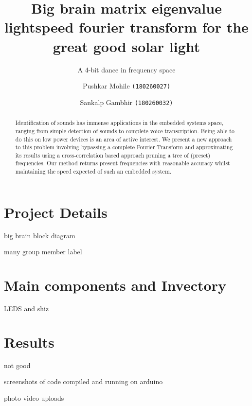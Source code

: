 \documentclass{llncs}
\title{Big brain matrix eigenvalue lightspeed fourier transform for the great good solar light}
\subtitle{A 4-bit dance in frequency space}
\author{Pushkar Mohile \texttt{(180260027)}\inst{1} \and Sankalp Gambhir \texttt{(180260032)}\inst{1}}
\institute{Indian Institute of Technology, Bombay}
\begin{document}
\maketitle

\begin{abstract}
Identification of sounds has immense applications in the embedded systems space,
ranging from simple detection of sounds to complete voice transcription. Being
able to do this on low power devices is an area of active interest. We present a
new approach to this problem involving bypassing a complete Fourier Transform
and approximating its results using a cross-correlation based approach pruning a
tree of (preset) frequencies. Our method returns present frequencies with
reasonable accuracy whilst maintaining the speed expected of such an embedded
system.
\end{abstract}

\section{Project Details}
 big brain block diagram

 many group member label

\section{Main components and Invectory}
 LEDS and shiz

\section{Results}
 not good

 screenshots of code compiled and running on arduino
 
 photo video uploads

\newpage

\end{document}
